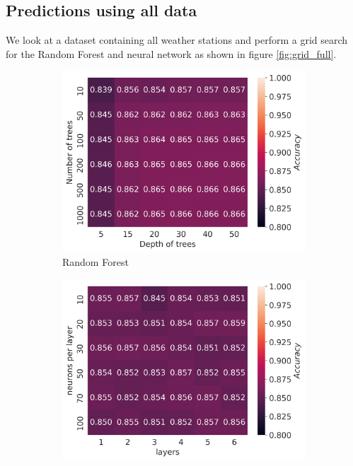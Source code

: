 \documentclass[11pt]{article}
\begin{document}
\subsection{Predictions using all data}
We look at a dataset containing all weather stations and perform a grid search for the Random Forest and neural network as shown in figure \ref{fig:grid_full}.
\begin{figure}[H]
    \begin{subfigure}{.5\textwidth}
        \centering
        \includegraphics[width=\textwidth]{../figures/RF_grid_all.png}
        \caption{Random Forest}
        \label{fig:rf_full}
    \end{subfigure}
    \begin{subfigure}{.5\textwidth}
        \centering
        \includegraphics[width=\textwidth]{../figures/NN_grid_ADAM_all.png}

\end{subfigure}
\end{figure}
\end{document}
